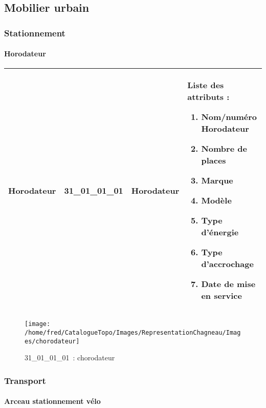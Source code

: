 \documentclass[12pt,titlepage]{book}
\begin{document}
\subsection{Mobilier urbain}
\subsubsection{\large Stationnement}
\paragraph{Horodateur}
\noindent
\vspace{\baselineskip}

\renewcommand{\arraystretch}{1.2}
\begin{supertabular}{|p{10cm}|c|p{13cm}|p{12cm}|}
 Horodateur & 31\_01\_01\_01 & Horodateur & Liste des attributs :
\begin{enumerate}
  \item Nom/numéro Horodateur  \item Nombre de places  \item Marque  \item Modèle  \item Type d'énergie  \item Type d'accrochage  \item Date de mise en service\end{enumerate}
\\
\hline
\end{supertabular}
\begin{figure}[h!]
  \hfill         %
  \begin{minipage}[t]{3cm}
    \begin{center}
      \texttt{[image: /home/fred/CatalogueTopo/Images/RepresentationChagneau/Images/chorodateur]}
      \caption[~31\_01\_01\_01]{\small{31\_01\_01\_01~:} \tiny{chorodateur}}\label{chorodateur}
    \end{center}
  \end{minipage}
\end{figure}

\subsubsection{\large Transport}
\paragraph{Arceau stationnement vélo}
\noindent
\vspace{\baselineskip}
\end{document}
